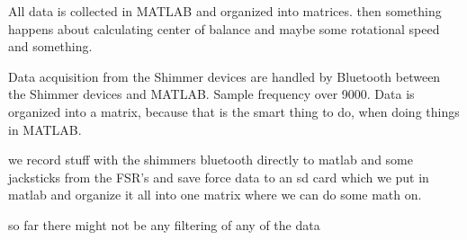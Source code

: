 All data is collected in MATLAB and organized into matrices. then something happens about calculating center of balance and maybe some rotational speed and something. 

Data acquisition from the Shimmer devices are handled by Bluetooth between the Shimmer devices and MATLAB. Sample frequency over 9000. Data is organized into a matrix, because that is the smart thing to do, when doing things in MATLAB.





we record stuff with the shimmers bluetooth directly to matlab and some jacksticks from the FSR's and save force data to an sd card which we put in matlab and organize it all into one matrix where we can do some math on. 

so far there might not be any filtering of any of the data







